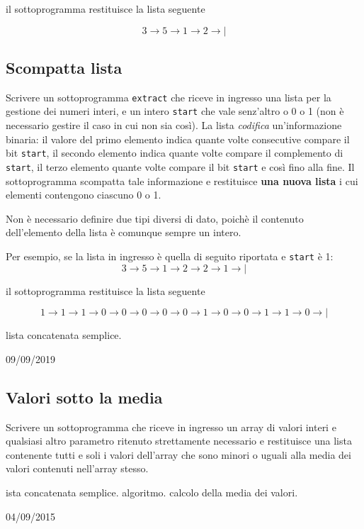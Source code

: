 il sottoprogramma restituisce la lista seguente

$$
3 \rightarrow 5 \rightarrow 1 \rightarrow 2 \rightarrow|
$$ 




\subsection{Scompatta lista}
Scrivere un sottoprogramma \texttt{extract} che riceve in ingresso una lista per la gestione dei numeri interi, e un intero \texttt{start} che vale senz'altro o 0 o 1 (non \`e necessario gestire il caso in cui non sia cos\`i). La lista \textit{codifica} un'informazione binaria: il valore del primo elemento indica quante volte consecutive compare il bit \texttt{start}, il secondo elemento indica quante volte compare il complemento di \texttt{start}, il terzo elemento quante volte compare il bit  \texttt{start} e cos\`i fino alla fine.
Il sottoprogramma scompatta tale informazione e restituisce \textbf{una nuova lista} i cui elementi contengono ciascuno 0 o 1. 

Non \`e necessario definire due tipi diversi di dato, poich\`e il contenuto dell'elemento della lista \`e comunque sempre un intero. 

Per esempio, se la lista in ingresso \`e quella di seguito riportata e \texttt{start} \`e 1:
$$
3 \rightarrow 5 \rightarrow 1 \rightarrow 2  \rightarrow 2 \rightarrow 1 \rightarrow|
$$ 

il sottoprogramma restituisce la lista seguente

$$
1 \rightarrow 1 \rightarrow 1 \rightarrow 0 \rightarrow 0 \rightarrow 0 \rightarrow 0 \rightarrow 0 \rightarrow 1 \rightarrow 0 \rightarrow 0 \rightarrow 1 \rightarrow 1 \rightarrow 0 \rightarrow|
$$ 

\begin{tags}
lista concatenata semplice. 
\end{tags}

\begin{esame}
09/09/2019
\end{esame}




\subsection{Valori sotto la media}
Scrivere un sottoprogramma che riceve in ingresso un array di valori interi e qualsiasi altro parametro ritenuto strettamente necessario e restituisce una lista contenente tutti e soli i valori dell'array che sono minori o uguali alla media dei valori contenuti nell'array stesso.

\begin{tags}
ista concatenata semplice. algoritmo. calcolo della media dei valori.
\end{tags}

\begin{esame}
04/09/2015
\end{esame}


 